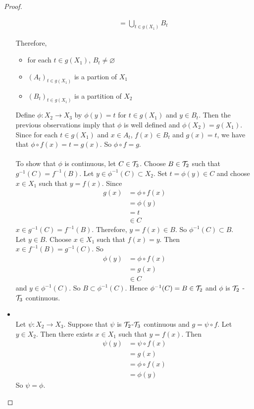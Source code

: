 \documentclass{book}
\begin{document}
\begin{proof}
\begin{itemize}
\begin{itemize}
\begin{align*}
	&= \bigcup_{t \in g(X_1)} B_t
	\end{align*}
	\end{itemize}
	Therefore, 
	\begin{itemize}
	\item for each $t \in g(X_1)$, $B_t \neq \varnothing$
	\item $(A_t)_{t \in g(X_1)}$ is a partion of $X_1$
	\item $(B_t)_{t \in g(X_1)}$ is a partition of $X_2$\\
\end{itemize}		
	 Define $\phi:X_2 \rightarrow X_3$ by $\phi(y) = t$ for $t \in g(X_1)$ and $y \in B_t $. Then the previous observations imply that $\phi$ is well defined and $\phi(X_2) = g(X_1)$. Since for each $t \in g(X_1)$ and $x \in A_t$, $f(x) \in B_t$ and $g(x) = t$, we have that $\phi \circ f (x) = t = g(x)$. So $\phi \circ f = g$. \\ \\
	To show that $\phi$ is continuous, let $C \in \mathcal{T}_3$. Choose $B \in \mathcal{T}_2$ such that $g^{-1}(C) = f^{-1}(B)$.
	Let $y \in \phi^{-1}(C) \subset X_2$. Set $t = \phi(y) \in C$ and choose $x \in X_1$ such that $y = f(x)$. Since 
	\begin{align*}
	g(x) 
	&= \phi \circ f (x) \\
	&= \phi(y) \\
	&= t \\
	&\in C
\end{align*}		
	 $x \in g^{-1}(C) = f^{-1}(B)$. Therefore, $y = f(x) \in B$. So $\phi^{-1}(C) \subset B$. \\
	Let $y \in B$. Choose $x \in X_1$ such that $f(x) = y$. Then $x \in f^{-1}(B) = g^{-1}(C)$. So 
	\begin{align*}
	\phi(y) 
	&= \phi \circ f (x) \\
	&= g(x) \\
	&\in C
	\end{align*}	 
	and $y \in \phi^{-1}(C)$. So $B \subset \phi^{-1}(C)$. 
	Hence $\phi^{-1}(C) = B \in \mathcal{T}_2$ and $\phi$ is $\mathcal{T}_2$ - $\mathcal{T}_3$ continuous.\\
	\item {} \\
	Let $\psi: X_2 \rightarrow X_3$. Suppose that $\psi$ is $\mathcal{T}_2$-$\mathcal{T}_3$ continuous and $g = \psi \circ f$. Let $y \in X_2$. Then there exists $x \in X_1$ such that $y = f(x)$. Then 
	\begin{align*}
	\psi(y) 
	&= \psi \circ f(x) \\
	&= g(x) \\
	&= \phi \circ f(x) \\
	&= \phi(y)
	\end{align*}
	So $\psi = \phi$.
	\end{itemize}
 
	\end{proof}
\end{document}
